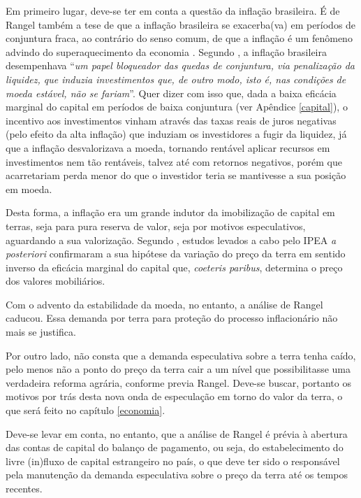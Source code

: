 \documentclass[
	12pt,				%
	oneside,			%
	a4paper,			%
	chapter=TITLE,		%
	section=TITLE,		%
	english,			%
	brazil				%
	]{abntex2}
\begin{document}
Em primeiro lugar, deve-se ter em conta a questão da inflação brasileira. É de
Rangel também a tese de que a inflação brasileira se exacerba(va) em períodos de
conjuntura fraca, ao contrário do senso comum, de que a inflação é um fenômeno
advindo do superaquecimento da economia \autocite{inflacao-brasileira}. Segundo \textcite{rangel},
a inflação brasileira desempenhava ``\emph{um papel bloqueador das quedas de
conjuntura, via penalização da liquidez, que induzia investimentos que, de outro
modo, isto é, nas condições de moeda estável, não se fariam}''. Quer dizer com
isso que, dada a baixa eficácia marginal do capital em períodos de baixa
conjuntura (ver Apêndice \ref{capital}), o incentivo aos investimentos
vinham através das taxas reais de juros negativas (pelo efeito da alta inflação)
que induziam os investidores a fugir da liquidez, já que a inflação
desvalorizava a moeda, tornando rentável aplicar recursos em investimentos nem
tão rentáveis, talvez até com retornos negativos, porém que acarretariam perda
menor do que o investidor teria se mantivesse a sua posição em moeda.

Desta forma, a inflação era um grande indutor da imobilização de capital em
terras, seja para pura reserva de valor, seja por motivos especulativos,
aguardando a sua valorização. Segundo \textcite{rangel1986b}, estudos levados a cabo pelo
IPEA \emph{a posteriori} confirmaram a sua hipótese da variação do preço da terra em
sentido inverso da eficácia marginal do capital que, \emph{coeteris paribus},
determina o preço dos valores mobiliários.

Com o advento da estabilidade da moeda, no entanto, a análise de Rangel caducou.
Essa demanda por terra para proteção do processo inflacionário não mais se
justifica.

Por outro lado, não consta que a demanda especulativa sobre a terra tenha caído,
pelo menos não a ponto do preço da terra cair a um nível que possibilitasse uma
verdadeira reforma agrária, conforme previa Rangel. Deve-se buscar, portanto os
motivos por trás desta nova onda de especulação em torno do valor da terra, o
que será feito no capítulo \ref{economia}.

Deve-se levar em conta, no entanto, que a análise de Rangel é prévia à abertura
das contas de capital do balanço de pagamento, ou seja, do estabelecimento do
livre (in)fluxo de capital estrangeiro no país, o que deve ter sido o
responsável pela manutenção da demanda especulativa sobre o preço da terra até
os tempos recentes.
\end{document}
